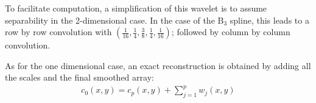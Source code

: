 To facilitate computation, a simplification of this wavelet is to assume
separability in the 2-dimensional case.  In the case of the B$_3$ spline, this
leads to a row by row convolution with $(\frac{1}{16}, \frac{1}{4}, 
\frac{3}{8}, \frac{1}{4}, \frac{1}{16})$; followed by column by column 
convolution. 

As for the one dimensional case, an exact reconstruction is obtained
by adding all the scales and the final smoothed array:
\begin{eqnarray}
c_0(x,y) = c_{p}(x,y) + \sum_{j=1}^{p} w_j(x,y)
\label{eqn_rec}
\end{eqnarray}

% 
% 
 
